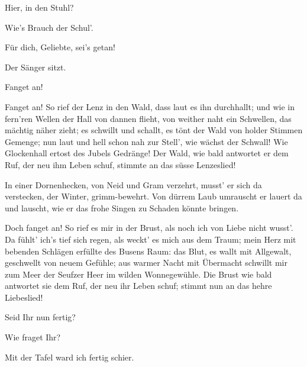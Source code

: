 \begin{drama}
\Waltherspeaks


Hier, in den Stuhl?

\Kothnerspeaks
Wie's Brauch der Schul'.

\Waltherspeaks
{}

Für dich, Geliebte, sei's getan!

\Kothnerspeaks
{}

Der Sänger sitzt.

\Beckmesserspeaks
{}

Fanget an!

\Waltherspeaks
Fanget an!
So rief der Lenz in den Wald,
dass laut es ihn durchhallt;
und wie in fern'ren Wellen
der Hall von dannen flieht,
von weither naht ein Schwellen,
das mächtig näher zieht;
es schwillt und schallt,
es tönt der Wald
von holder Stimmen Gemenge;
nun laut und hell schon nah zur Stell',
wie wächst der Schwall! Wie Glockenhall
ertost des Jubels Gedränge!
Der Wald, wie bald
antwortet er dem Ruf,
der neu ihm Leben schuf,
stimmte an
das süsse Lenzeslied!


In einer Dornenhecken,
von Neid und Gram verzehrt,
musst' er sich da verstecken,
der Winter, grimm-bewehrt.
Von dürrem Laub umrauscht
er lauert da und lauscht,
wie er das frohe Singen
zu Schaden könnte bringen.


Doch fanget an!
So rief es mir in der Brust,
als noch ich von Liebe nicht wusst'.
Da fühlt' ich's tief sich regen,
als weckt' es mich aus dem Traum;
mein Herz mit bebenden Schlägen
erfüllte des Busens Raum:
das Blut, es wallt mit Allgewalt,
geschwellt von neuem Gefühle;
aus warmer Nacht mit Übermacht
schwillt mir zum Meer der Seufzer Heer
im wilden Wonnegewühle.
Die Brust wie bald
antwortet sie dem Ruf,
der neu ihr Leben schuf;
stimmt nun an
das hehre Liebeslied!

\Beckmesserspeaks
{}

Seid Ihr nun fertig?

\Waltherspeaks
Wie fraget Ihr?

\Beckmesserspeaks
Mit der Tafel ward ich fertig schier.


\end{drama}
